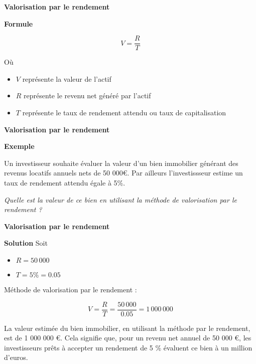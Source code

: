 \documentclass{beamer}
\begin{document}
\begin{frame}{\textbf{Valorisation par le rendement}}

\begin{alertblock}{\textbf{Formule}}

\[ V = \frac{R}{T} \]

Où

\begin{itemize}
	\item \( V \) représente la valeur de l'actif
	\item \( R \) représente le revenu net généré par l’actif
	\item \( T \) représente le taux de rendement attendu ou taux de capitalisation
\end{itemize}

\end{alertblock}

\end{frame}
	
\begin{frame}{\textbf{Valorisation par le rendement}}

\begin{exampleblock}{\textbf{Exemple}}

Un investisseur souhaite évaluer la valeur d’un bien immobilier générant des revenus locatifs annuels nets de 50 000€. Par ailleurs l'investissseur estime un taux de rendement attendu égale à 5\%.

\vspace*{1cm}
\textit{Quelle est la valeur de ce bien en utilisant la méthode de valorisation par le rendement ?}

\end{exampleblock}


\end{frame}
\begin{frame}{\textbf{Valorisation par le rendement}}
	
	\begin{exampleblock}{\textbf{Solution}}
Soit

\begin{itemize}
	\item \( R = 50\,000\)
	\item \( T = 5\%=0.05\)
\end{itemize}

Méthode de valorisation par le rendement :

\[ V = \frac{R}{T} = \frac{50\,000}{0.05}= 1\,000\,000 \]

La valeur estimée du bien immobilier, en utilisant la méthode par le rendement, est de 1 000 000 €. Cela signifie que, pour un revenu net annuel de 50 000 €, les investisseurs prêts à accepter un rendement de 5 \% évaluent ce bien à un million d’euros.
		
	\end{exampleblock}
	
	
\end{frame}
\end{document}
